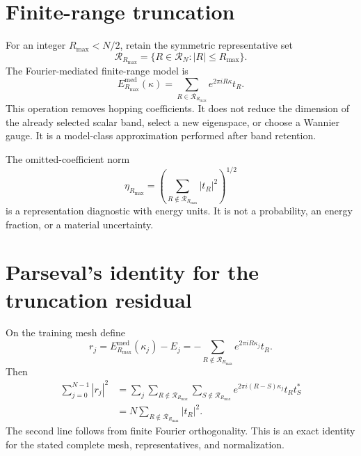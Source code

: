 \section{Finite-range truncation}

For an integer $R_{\max}<N/2$, retain the symmetric representative set
\begin{equation}
  \mathcal R_{R_{\max}}
  =\{R\in\mathcal R_N:|R|\leq R_{\max}\}.
  \label{eq:training-isolated-range-set}
\end{equation}
The Fourier-mediated finite-range model is
\begin{equation}
  E_{R_{\max}}^{\mathrm{med}}(\kappa)
  =\sum_{R\in\mathcal R_{R_{\max}}}
    e^{2\pi iR\kappa}t_R.
  \label{eq:training-isolated-truncated-band}
\end{equation}
This operation removes hopping coefficients. It does not reduce the dimension
of the already selected scalar band, select a new eigenspace, or choose a
Wannier gauge. It is a model-class approximation performed after band
retention.

The omitted-coefficient norm
\begin{equation}
  \eta_{R_{\max}}
  =\left(
    \sum_{R\notin\mathcal R_{R_{\max}}}|t_R|^2
   \right)^{1/2}
  \label{eq:training-isolated-omitted-norm}
\end{equation}
is a representation diagnostic with energy units. It is not a probability, an
energy fraction, or a material uncertainty.

\section{Parseval's identity for the truncation residual}

On the training mesh define
\begin{equation}
  r_j
  =E_{R_{\max}}^{\mathrm{med}}(\kappa_j)-E_j
  =-\sum_{R\notin\mathcal R_{R_{\max}}}
    e^{2\pi iR\kappa_j}t_R.
  \label{eq:training-isolated-training-residual}
\end{equation}
Then
\begin{align}
  \sum_{j=0}^{N-1}|r_j|^2
  &=\sum_j
    \sum_{R\notin\mathcal R_{R_{\max}}}
    \sum_{S\notin\mathcal R_{R_{\max}}}
    e^{2\pi i(R-S)\kappa_j}t_Rt_S^*\\
  &=N\sum_{R\notin\mathcal R_{R_{\max}}}|t_R|^2.
  \label{eq:training-isolated-parseval}
\end{align}
The second line follows from finite Fourier orthogonality. This is an exact
identity for the stated complete mesh, representatives, and normalization.

